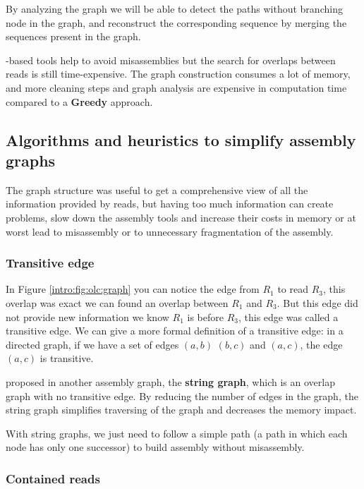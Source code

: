 \documentclass[main]{subfiles}
\begin{document}
By analyzing the graph we will be able to detect the paths without branching node in the graph, and reconstruct the corresponding sequence by merging the sequences present in the graph.

\OLC-based tools help to avoid misassemblies but the search for overlaps between reads is still time-expensive. The graph construction consumes a lot of memory, and more cleaning steps and graph analysis are expensive in computation time compared to a \textbf{Greedy} approach. 

\subsection{Algorithms and heuristics to simplify assembly graphs}

The graph structure was useful to get a comprehensive view of all the information provided by reads, but having too much information can create problems, slow down the assembly tools and increase their costs in memory or at worst lead to misassembly or to unnecessary fragmentation of the assembly.

\subsubsection{Transitive edge}  \label{intro:subsubsec:transitive_edge}

In Figure \ref{intro:fig:olc:graph} you can notice the edge from $R_1$ to read $R_3$, this overlap was exact we can found an overlap between $R_1$ and $R_3$. But this edge did not provide new information we know $R_1$ is before $R_3$, this edge was called a transitive edge. We can give a more formal definition of a transitive edge: in a directed graph, if we have a set of edges $(a, b)$ $(b, c)$ and $(a, c)$, the edge $(a, c)$ is transitive.

\citeauthor{string_graph} proposed in \cite{string_graph} another assembly graph, the \textbf{string graph}, which is an overlap graph with no transitive edge. By reducing the number of edges in the graph, the string graph simplifies traversing of the graph and decreases the memory impact.

With string graphs, we just need to follow a simple path (a path in which each node has only one successor) to build assembly without misassembly.

\subsubsection{Contained reads} \label{intro:subsubsec:contained_reads}
\end{document}

